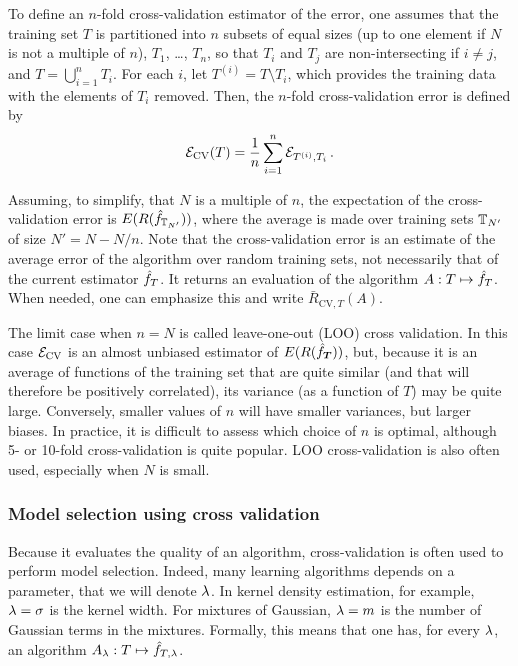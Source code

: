 To define an $n$-fold cross-validation estimator of the error, one assumes that the training set $T$ is partitioned into $n$ subsets of equal sizes (up to one element if $N$ is not a multiple of $n$), $T_1$, \ldots, $T_n$, so that $T_i$ and $T_j$ are non-intersecting if $i\neq j$, and $T = \bigcup_{i=1}^n T_i$.  For each $i$, let $T^{(i)} = T\setminus T_i$, which provides the training data with the elements of $T_i$ removed. Then, the $n$-fold cross-validation error is defined by
\[
{\mathcal E}_{\mathrm{CV}}(T) = \frac1n \sum_{i=1}^{n} {\mathcal E}_{T^{(i)}, T_i}\,.
\]

Assuming, to simplify, that $N$ is a multiple of $n$, the expectation of the cross-validation error is $E( R (\hat f_{{\mathbb T}_{N'}}))$, where the average is made over training sets ${\mathbb T}_{N'}$ of size $N' = N-N/n$. Note that the cross-validation error is an estimate of the average error of the algorithm over random training sets, not necessarily that of the current estimator ${\hat{f}}_T$. It returns an evaluation of the algorithm $A: T\mapsto {\hat{f}}_T$. When needed, one can emphasize this and write $\bar R_{\mathrm{CV}, T}(A)$.

The limit case when $n=N$ is called
leave-one-out (LOO) cross validation. In this case ${\mathcal E}_{\mathrm{CV}} $ is an almost unbiased estimator of $E( R ({\hat{f}}_{\bm T}))$, but, 
because it is an average of functions of the training set that are quite similar (and that will therefore be positively correlated), its variance (as a function of $T$) may be quite large. Conversely, smaller values of $n$ will have smaller variances, but larger biases. In practice, it is difficult to assess which choice of $n$ is optimal, although 5- or 10-fold cross-validation is quite popular. LOO cross-validation is also often used, especially when $N$ is small.

\subsubsection{Model selection using cross validation}

Because it evaluates the quality of an algorithm, cross-validation is often used to perform model selection. Indeed, many learning algorithms depends on a parameter, that we will denote $\lambda$. In kernel density estimation,  for example, $\lambda=\sigma$ is the kernel width. For mixtures of Gaussian, $\lambda =m$ is the number of Gaussian terms in the mixtures. Formally, this means that one has, for every $\lambda$, an algorithm $A_\lambda: T \mapsto {\hat{f}}_{T, \lambda}$. 


